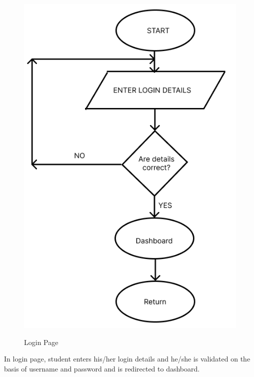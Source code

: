 \begin{figure}[H]
    \centering
    \includegraphics[scale=0.4]{images/login_flowchart.png}\\[0.5cm]
    \caption{Login Page}
    \label{fig:my_label}
\end{figure}

\noindent
In login page, student enters his/her login details and he/she is validated on the basis of username and password and is redirected to dashboard.

